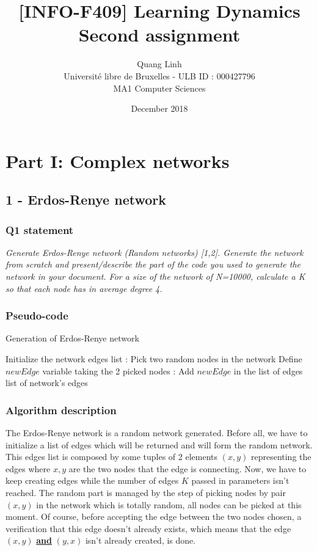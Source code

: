 \documentclass{article}
\title{[INFO-F409] Learning Dynamics \\ Second assignment}
\author{\bsc{BUI QUANG PHUONG} Quang Linh \\ Université libre de Bruxelles - ULB ID : 000427796  \\ MA1 Computer Sciences}
\date{December 2018}
\begin{document}
\maketitle

\tableofcontents

\newpage
\section{Part I: Complex networks}

\subsection{1 - Erdos-Renye network}

\subsubsection{Q1 statement}

\textit{Generate Erdos-Renye network (Random networks) [1,2]. Generate the network from scratch and present/describe the part of the code you used to generate the network in your document. For a size of the network of N=10000, calculate a K so that each node has in average degree 4.} 

\subsubsection*{Pseudo-code}

\begin{algorithm}
  \caption{Generation of Erdos-Renye network}\label{euclid}
  \begin{algorithmic}[1]
  \State Initialize the network edges list
  :
  \State Pick two random nodes in the network
  \State Define $newEdge$ variable taking the 2 picked nodes  
  \EndFor
  :
  \State Add $newEdge$ in the list of edges
  \EndIf
  \Return list of network's edges  
  \EndProcedure
  \end{algorithmic}
\end{algorithm}

\subsubsection*{Algorithm description} 

The Erdos-Renye network is a random network generated. Before all, we have to initialize a list of edges which will be returned and will form the random network. This edges list is composed by some tuples of 2 elements $(x,y)$ representing the edges where $x,y$ are the two nodes that the edge is connecting. Now, we have to keep creating edges while the number of edges $K$ passed in parameters isn't reached. The random part is managed by the step of picking nodes by pair $(x,y)$ in the network which is totally random, all nodes can be picked at this moment. Of course, before accepting the edge between the two nodes chosen, a verification that this edge doesn't already exists, which means that the edge $(x,y)$ \textbf{\underline{and}} $(y,x)$ isn't already created, is done.
\end{document}
